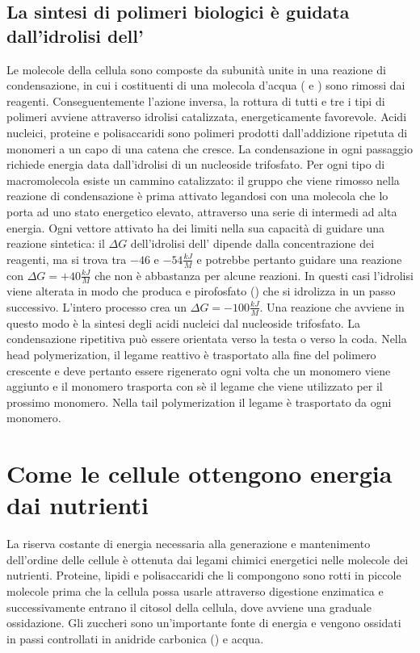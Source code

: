 \subsection{La sintesi di polimeri biologici \`e guidata dall'idrolisi dell'}
Le molecole della cellula sono composte da subunit\`a unite in una reazione di condensazione, in cui i costituenti di una molecola d'acqua ( e ) sono rimossi dai reagenti.
Conseguentemente l'azione inversa, la rottura di tutti e tre i tipi di polimeri avviene attraverso idrolisi catalizzata, energeticamente favorevole. Acidi nucleici, proteine e 
polisaccaridi sono polimeri prodotti dall'addizione ripetuta di monomeri a un capo di una catena che cresce. La condensazione in ogni passaggio richiede energia data dall'idrolisi di un
nucleoside trifosfato. Per ogni tipo di macromolecola esiste un cammino catalizzato: il gruppo  che viene rimosso nella reazione di condensazione \`e prima attivato legandosi
con una molecola che lo porta ad uno stato energetico elevato, attraverso una serie di intermedi ad alta energia. Ogni vettore attivato ha dei limiti nella sua capacit\`a di guidare una
reazione sintetica: il $\Delta G$ dell'idrolisi dell' dipende dalla concentrazione dei reagenti, ma si trova tra $-46$ e $-54\frac{kJ}{M}$ e potrebbe pertanto guidare una 
reazione con $\Delta G = +40\frac{kJ}{M}$ che non \`e abbastanza per alcune reazioni. In questi casi l'idrolisi viene alterata in modo che produca  e pirofosfato () che
si idrolizza in un passo successivo. L'intero processo crea un $\Delta G = -100\frac{kJ}{M}$. Una reazione che avviene in questo modo \`e la sintesi degli acidi nucleici dal nucleoside
trifosfato. La condensazione ripetitiva pu\`o essere orientata verso la testa o verso la coda. Nella head polymerization, il legame reattivo \`e trasportato alla fine del polimero 
crescente e deve pertanto essere rigenerato ogni volta che un monomero viene aggiunto e il monomero trasporta con s\`e il legame che viene utilizzato per il prossimo monomero. Nella 
tail polymerization il legame \`e trasportato da ogni monomero. 
\section{Come le cellule ottengono energia dai nutrienti}
La riserva costante di energia necessaria alla generazione e mantenimento dell'ordine delle cellule \`e ottenuta dai legami chimici energetici nelle molecole dei nutrienti. Proteine, 
lipidi e polisaccaridi che li compongono sono rotti in piccole molecole prima che la cellula possa usarle attraverso digestione enzimatica e successivamente entrano il citosol della 
cellula, dove avviene una graduale ossidazione. Gli zuccheri sono un'importante fonte di energia e vengono ossidati in passi controllati in anidride carbonica () e acqua. 
